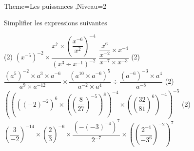 \documentclass[a4paper,12pt]{article}
\begin{document}
\begin{Maquette}[Fiche]{Theme=Les puissances ,Niveau=2}
\begin{exercice}
Simplifier les expressions suivantes
\begin{tasks}(2)
\task $(x^{-5})^{-2}\times\dfrac{x^{7}\times\left(\dfrac{x^{-6}}{x^{2}} \right)^{-4}}{(x^{3}\div x^{-1})^{-2}}$
\task $\dfrac{\dfrac{x^{6}}{x^{-2}}\times x^{-4}}{x^{-7}\times x^{-3}}$
\task*(2) $\dfrac{(a^{5})^{-2}\times a^{3}\times a^{-6}}{a^{9}\times a^{-12}}\times\dfrac{(a^{10}\times a^{-6})^{5}}{a^{-2}\times a^{4}}\div\dfrac{(a^{-6})^{-3}\times a^{4}}{a^{-8}} $
\task*(2) $\left(\left(\left(\left(-2\right)^{-2}\right)^{6}\times\left(\left(\dfrac{8}{27}\right)^{-5}\right)^{8}\right)^{-4}\times\left(\left(\dfrac{32}{81}\right)^{6}\right)^{-4}\right)^{-5}$
\task*(2) $\left(\dfrac{3}{-2}\right)^{-14}\times\left(\dfrac{2}{3}\right)^{-6}\times\dfrac{\left(-\left(-3\right)^{-4}\right)^{7}}{2^{-7}}\times\left(\left(\dfrac{2^{-4}}{-3^{6}}\right)^{-2}\right)^{7}$
\end{tasks}

\end{exercice}













\end{Maquette}
\end{document}
